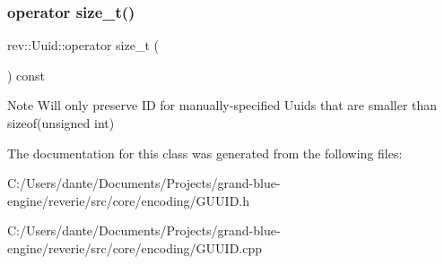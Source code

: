 \subsubsection{\texorpdfstring{operator size\_t()}{operator size\_t()}}
{\footnotesize\ttfamily rev\+::\+Uuid\+::operator size\+\_\+t (\begin{DoxyParamCaption}{ }\end{DoxyParamCaption}) const\hspace{0.3cm}{\ttfamily [explicit]}}

\begin{DoxyNote}{Note}
Will only preserve ID for manually-\/specified Uuids that are smaller than sizeof(unsigned int) 
\end{DoxyNote}


The documentation for this class was generated from the following files\+:\begin{DoxyCompactItemize}
\item 
C\+:/\+Users/dante/\+Documents/\+Projects/grand-\/blue-\/engine/reverie/src/core/encoding/G\+U\+U\+I\+D.\+h\item 
C\+:/\+Users/dante/\+Documents/\+Projects/grand-\/blue-\/engine/reverie/src/core/encoding/G\+U\+U\+I\+D.\+cpp\end{DoxyCompactItemize}
